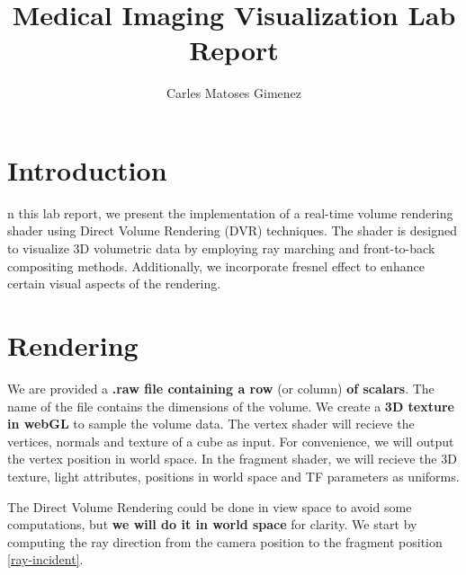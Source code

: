 \documentclass[10pt,a4paper,twoside]{tau-book}
\title{Medical Imaging Visualization Lab Report}
\author[1]{Carles Matoses Gimenez}
\affil[1]{Universitat Politècnica de Catalunya - BarcelonaTech}
\begin{document}
	
    \maketitle
    \abscontent
    \thispagestyle{firststyle}





\section{Introduction}

    n this lab report, we present the implementation of a real-time volume rendering shader using Direct Volume Rendering (DVR) techniques. The shader is designed to visualize 3D volumetric data by employing ray marching and front-to-back compositing methods. Additionally, we incorporate fresnel effect to enhance certain visual aspects of the rendering.

\section{Rendering}

We are provided a \textbf{.raw file containing a row} (or column) \textbf{of scalars}. The name of the file contains the dimensions of the volume. We create a \textbf{3D texture in webGL} to sample the volume data. The vertex shader will recieve the vertices, normals and texture of a cube as input. For convenience, we will output the vertex position in world space. In the fragment shader, we will recieve the 3D texture, light attributes, positions in world space and TF parameters as uniforms.



The Direct Volume Rendering could be done in view space to avoid some computations, but \textbf{we will do it in world space} for clarity. 
We start by computing the ray direction from the camera position to the fragment position \ref{ray-incident}. 
\end{document}
